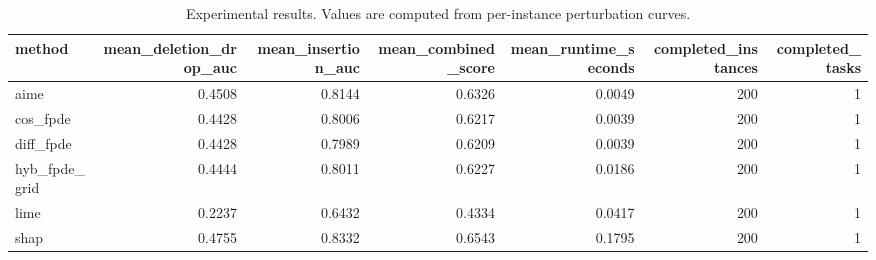 \begin{table}[t]
\caption{Experimental results. Values are computed from per-instance perturbation curves.}
\label{tab:main_results_computed}
\centering
\begin{tabular}{lrrrrrr}
\toprule
method & mean\_deletion\_drop\_auc & mean\_insertion\_auc & mean\_combined\_score & mean\_runtime\_seconds & completed\_instances & completed\_tasks \\
\midrule
aime & 0.4508 & 0.8144 & 0.6326 & 0.0049 & 200 & 1 \\
cos\_fpde & 0.4428 & 0.8006 & 0.6217 & 0.0039 & 200 & 1 \\
diff\_fpde & 0.4428 & 0.7989 & 0.6209 & 0.0039 & 200 & 1 \\
hyb\_fpde\_grid & 0.4444 & 0.8011 & 0.6227 & 0.0186 & 200 & 1 \\
lime & 0.2237 & 0.6432 & 0.4334 & 0.0417 & 200 & 1 \\
shap & 0.4755 & 0.8332 & 0.6543 & 0.1795 & 200 & 1 \\
\bottomrule
\end{tabular}

\end{table}
